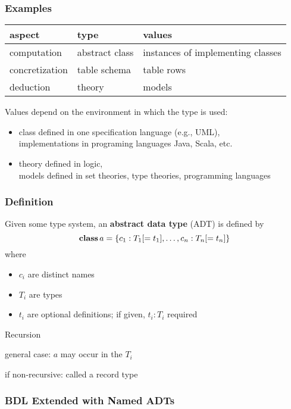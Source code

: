 \begin{frame}\frametitle{Examples}
\begin{center}
\begin{tabular}{l|ll}
aspect & type & values \\
\hline
computation & abstract class & instances of implementing classes \\
concretization & table schema & table rows \\
deduction & theory & models
\end{tabular}
\end{center}

Values depend on the environment in which the type is used:
\begin{itemize}
\item class defined in one specification language (e.g., UML), \\
 implementations in programing languages Java, Scala, etc.
\item theory defined in logic,\\
 models defined in set theories, type theories, programming languages
\end{itemize}
\end{frame}

\begin{frame}\frametitle{Definition}
Given some type system, an \textbf{abstract data type} (ADT) is defined by
  \[\textbf{class}\, a = \{c_1:T_1[=t_1],\ldots,c_n:T_n[=t_n]\}\]
  where
  \begin{itemize}
  \item $c_i$ are distinct names
  \item $T_i$ are types
  \item $t_i$ are optional definitions; if given, $t_i:T_i$ required
  \end{itemize}

\begin{blockitems}{Recursion}
\item general case: $a$ may occur in the $T_i$
\item if non-recursive: called a record type
\end{blockitems}
\end{frame}

\begin{frame}\frametitle{BDL Extended with Named ADTs}\label{def:bdl+adt}
\begin{commgrammar}
\\
\\
\\
\\
\\
\\
\\
\\
\end{commgrammar}
\end{frame}

